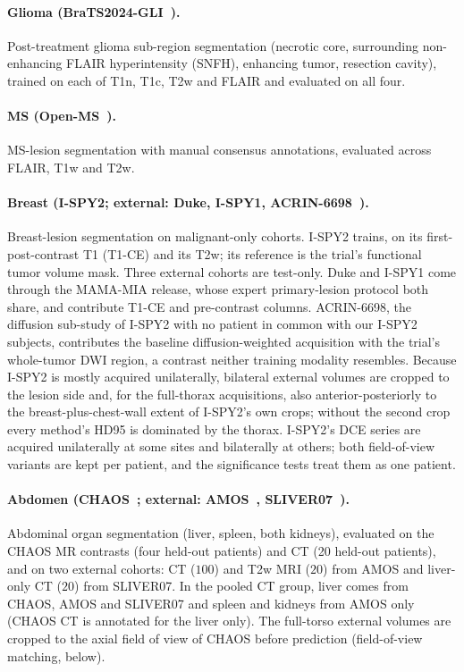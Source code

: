 \paragraph{Glioma (BraTS2024-GLI~\cite{deverdier2024brats2024}).} Post-treatment
glioma sub-region segmentation (necrotic core, surrounding non-enhancing FLAIR
hyperintensity (SNFH), enhancing tumor, resection cavity), trained on each of
T1n, T1c, T2w and FLAIR and evaluated on all four.

\paragraph{MS (Open-MS~\cite{lesjak2018openms}).} MS-lesion segmentation with
manual consensus annotations, evaluated across FLAIR, T1w and T2w.

\paragraph{Breast (I-SPY2; external: Duke, I-SPY1, ACRIN-6698~\cite{li2022ispy2,saha2018duke,garrucho2025mamamia,hylton2012ispy1,partridge2018acrin6698}).}
Breast-lesion segmentation on malignant-only cohorts. I-SPY2
trains, on its first-post-contrast T1 (T1-CE) and its T2w; its reference is the
trial's functional tumor volume mask. Three external cohorts are test-only.
Duke and I-SPY1 come through the MAMA-MIA release, whose expert
primary-lesion protocol both share, and contribute T1-CE and pre-contrast
columns. ACRIN-6698, the diffusion sub-study of I-SPY2 with no patient in
common with our I-SPY2 subjects, contributes the baseline diffusion-weighted
acquisition with the trial's whole-tumor DWI region, a contrast neither
training modality resembles. Because I-SPY2 is mostly acquired unilaterally,
bilateral external volumes are cropped to the lesion side and, for the
full-thorax acquisitions, also anterior-posteriorly to the breast-plus-chest-wall
extent of I-SPY2's own crops; without the second crop every method's HD95 is
dominated by the thorax. I-SPY2's DCE series are acquired unilaterally at some
sites and bilaterally at others; both field-of-view variants are kept per
patient, and the significance tests treat them as one patient.

\paragraph{Abdomen (CHAOS~\cite{kavur2021chaos}; external: AMOS~\cite{ji2022amos}, SLIVER07~\cite{heimann2009comparison}).}
Abdominal organ segmentation (liver, spleen, both kidneys), evaluated on the
CHAOS MR contrasts (four held-out patients) and CT (20 held-out patients), and
on two external cohorts: CT ($100$) and T2w MRI ($20$) from AMOS and liver-only
CT ($20$) from SLIVER07. In the pooled CT group, liver comes from
CHAOS, AMOS and SLIVER07 and spleen and kidneys from AMOS only (CHAOS CT is
annotated for the liver only). The full-torso external volumes are cropped
to the axial field of view of CHAOS before prediction (field-of-view matching,
below).

